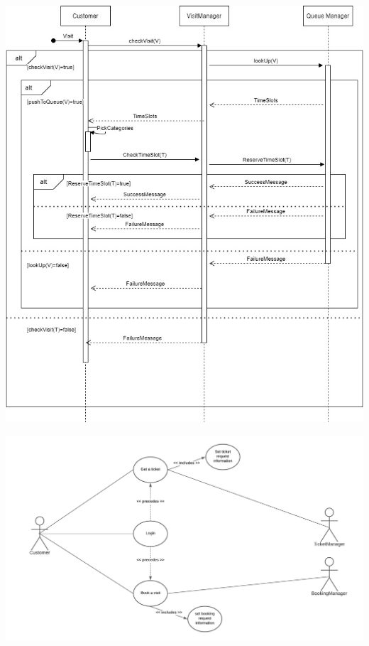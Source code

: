 \documentclass[a4paper, 12pt, oneside]{article}
\begin{document}
\begin{tabularx}{\linewidth}{| l | X |}
    \hline
    
\end{tabularx}

\begin{minipage}{\linewidth}
            \centering
           \includegraphics[height=0.5\textheight, scale=1, keepaspectratio]{img/seq_diag/GetVisitD.jpg}
\end{minipage}

\begin{minipage}{\linewidth}
        \centering
           \includegraphics[height=0.33\textheight, scale=0.1, keepaspectratio]{img/book_ticket_use_diagram.png}
        \end{minipage}
\end{document}
